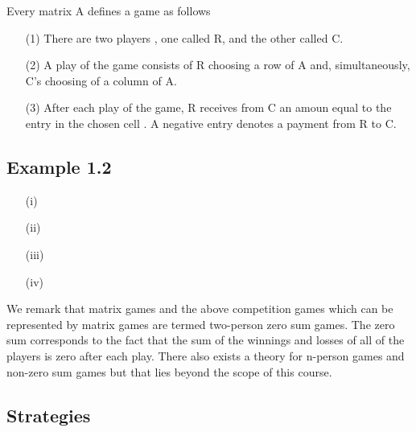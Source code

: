 
Every matrix A defines a game as follows
\begin{itemize}
\item[(1)] There are two players , one called R, and the other called C.
\item[(2)] A play of the game  consists of R choosing a row of A and, simultaneously, C's choosing of a column of A.
\item[(3)] After each play of the game, R receives from C an amoun equal to the entry in the chosen cell . A negative entry denotes a payment from R to C.

\end{itemize}


\subsection{Example 1.2}

\begin{itemize}
\item[(i)]
\item[(ii)]
\item[(iii)]
\item[(iv)] 
\end{itemize}

We remark that matrix games and the above competition games which can be represented
by matrix games are termed two-person zero sum games.
The zero sum corresponds to the fact that the sum of the winnings and losses of all of the players
is zero after each play.
There also exists a theory for n-person games and non-zero sum games but that lies beyond the scope of this course.
\subsection{Strategies}

